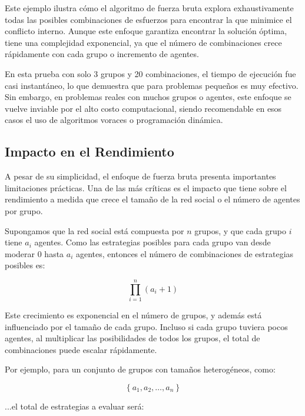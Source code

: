 \documentclass[11pt,letter]{article}
\begin{document}
    Este ejemplo ilustra cómo el algoritmo de fuerza bruta explora exhaustivamente todas las posibles combinaciones de esfuerzos para encontrar la que minimice el conflicto interno. Aunque este enfoque garantiza encontrar la solución óptima, tiene una complejidad exponencial, ya que el número de combinaciones crece rápidamente con cada grupo o incremento de agentes.

    En esta prueba con solo 3 grupos y 20 combinaciones, el tiempo de ejecución fue casi instantáneo, lo que demuestra que para problemas pequeños es muy efectivo. Sin embargo, en problemas reales con muchos grupos o agentes, este enfoque se vuelve inviable por el alto costo computacional, siendo recomendable en esos casos el uso de algoritmos voraces o programación dinámica.

    \subsection{Impacto en el Rendimiento}
    \label{sec:limitaciones_fuerza_bruta}

    A pesar de su simplicidad, el enfoque de fuerza bruta presenta importantes limitaciones prácticas. Una de las más críticas es el impacto que tiene sobre el rendimiento a medida que crece el tamaño de la red social o el número de agentes por grupo.

    Supongamos que la red social está compuesta por \( n \) grupos, y que cada grupo \( i \) tiene \( a_i \) agentes. Como las estrategias posibles para cada grupo van desde moderar 0 hasta \( a_i \) agentes, entonces el número de combinaciones de estrategias posibles es:

    \[
        \prod_{i=1}^{n} (a_i + 1)
    \]

    Este crecimiento es exponencial en el número de grupos, y además está influenciado por el tamaño de cada grupo. Incluso si cada grupo tuviera pocos agentes, al multiplicar las posibilidades de todos los grupos, el total de combinaciones puede escalar rápidamente.

    Por ejemplo, para un conjunto de grupos con tamaños heterogéneos, como:

    \[
        \left\{ a_1, a_2, \ldots, a_n \right\}
    \]

    ...el total de estrategias a evaluar será:
\end{document}
